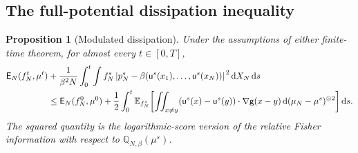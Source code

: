 \documentclass[11pt,reqno]{amsart}
\numberwithin{equation}{section}
\newtheorem{proposition}[proposition]{Proposition}
\theoremstyle{definition}
\theoremstyle{remark}
\newcommand{\E}{\mathbb E}
\newcommand{\g}{\mathsf g}
\newcommand{\Er}{\mathsf E}
\newcommand{\Q}{\mathbb Q}
\renewcommand{\u}{\mathsf u}
\newcommand{\dd}{\mathop{}\!\mathrm d}
\newcommand{\abs}[1]{\left\lvert#1\right\rvert}
\begin{document}
\subsection{The full-potential dissipation inequality}
\begin{proposition}[Modulated dissipation]\label{prop:dissipation}
Under the assumptions of either finite-time theorem, for almost every $t\in[0,T]$,
\begin{align}
 \Er_N(f_N^t,\mu^t)
 &+\frac1{\beta^2N}\int_0^t\int f_N^s
 \abs{p_N^s-\beta(\u^s(x_1),\ldots,\u^s(x_N))}^{\,2}\dd X_N\dd s\notag\\
 &\leq \Er_N(f_N^0,\mu^0)+\frac12\int_0^t
 \E_{f_N^s}\!\left[\iint_{x\ne y}(\u^s(x)-\u^s(y))\cdot\nabla\g(x-y)
                 \dd(\mu_N-\mu^s)^{\otimes2}\right]\dd s.
 \label{eq:full-dissipation}
\end{align}
The squared quantity is the logarithmic-score version of the relative Fisher information with respect to $\Q_{N,\beta}(\mu^s)$.
\end{proposition}
\end{document}
